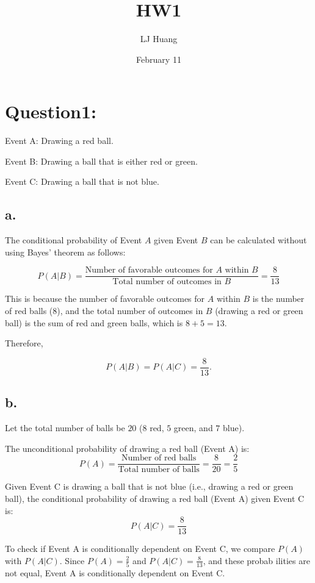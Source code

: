 \documentclass{article}
\title{HW1}
\author{LJ Huang}
\date{February 11}
\begin{document}
\maketitle
\section*{Question1:}
\indent\indent Event A: Drawing a red ball.

Event B: Drawing a ball that is either red or green.

Event C: Drawing a ball that is not blue.

\subsection*{a.}

The conditional probability of Event \(A\) given Event \(B\) can be calculated 
\indent without using Bayes’ theorem as follows:

\[P(A|B) = \frac{\text{Number of favorable outcomes for } A \text{ within } B}{\text{Total number of outcomes in } B} = \frac{8}{13}\]

This is because the number of favorable outcomes for \(A\) within \(B\) is the 
\indent number of red balls (8), and the total number of outcomes in \(B\) (drawing a 
\indent red or green ball) is the sum of red and green balls, which is \(8 + 5 = 13\).

Therefore, 

\[P(A|B) = P(A|C) = \frac{8}{13}.\]

\subsection*{b.}

Let the total number of balls be $20$ ($8$ red, $5$ green, and $7$ blue).

The unconditional probability of drawing a red ball (Event A) is:
\[P(A) = \frac{\text{Number of red balls}}{\text{Total number of balls}} = \frac{8}{20} = \frac{2}{5}\]

Given Event C is drawing a ball that is not blue (i.e., drawing a red or 
\indent green ball), the conditional probability of drawing a red ball (Event A) given 
\indent Event C is:
\[P(A|C) = \frac{8}{13}\]

To check if Event A is conditionally dependent on Event C, we compare 
\indent $P(A)$ with $P(A|C)$. Since $P(A) = \frac{2}{5}$ and $P(A|C) = \frac{8}{13}$, and these probab
\indent ilities are not equal, Event A is conditionally dependent on Event C.
\end{document}
